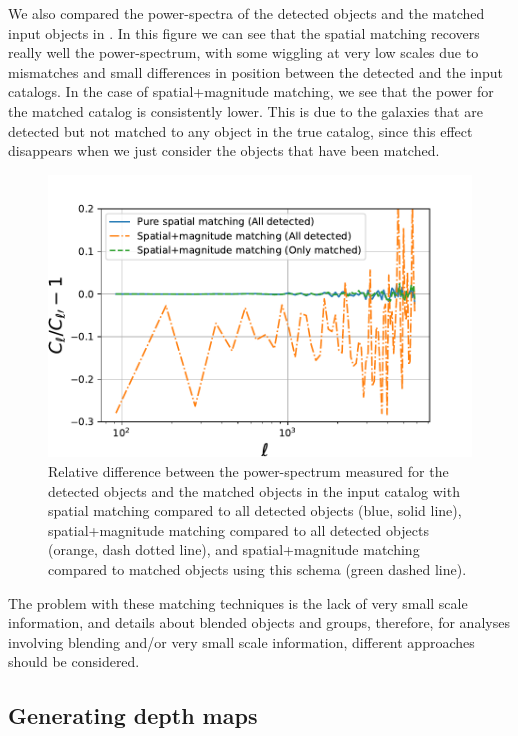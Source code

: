 \documentclass[\docopts]{\docclass}
\begin{document}
We also compared the power-spectra of the detected objects and the matched input objects in . In this figure we can see that the spatial matching recovers really well the power-spectrum, with some wiggling at very low scales due to mismatches and small differences in position between the detected and the input catalogs. In the case of spatial+magnitude matching, we see that the power for the matched catalog is consistently lower. This is due to the galaxies that are detected but not matched to any object in the true catalog, since this effect disappears when we just consider the objects that have been matched.

\begin{figure}
\centering
\includegraphics[width=0.9\columnwidth]{cl_comparison_matching.pdf}
\caption{Relative difference between the power-spectrum measured for the detected objects and the matched objects in the input catalog with spatial matching compared to all detected objects (blue, solid line), spatial+magnitude matching compared to all detected objects (orange, dash dotted line), and spatial+magnitude matching compared to matched objects using this schema (green dashed line).}
\label{fig:matching_cls}
\end{figure}
 
The problem with these matching techniques is the lack of very small scale information, and details about blended objects and groups, therefore, for analyses involving blending and/or very small scale information, different approaches should be considered. 
 

\subsection{Generating depth maps}
\label{sec:masking}
\end{document}
